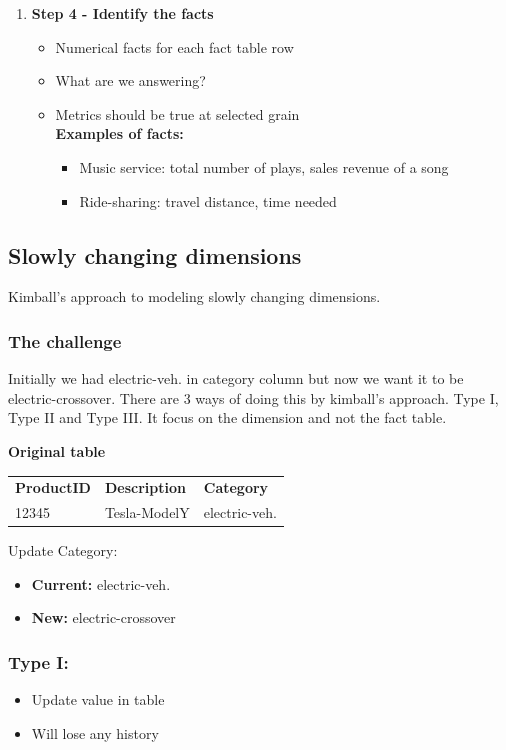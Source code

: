 \begin{enumerate}
\begin{itemize}
\begin{itemize}
        \end{itemize}
    \end{itemize}
    \item \textbf{Step 4 - Identify the facts}
    \begin{itemize}
        \item Numerical facts for each fact table row
        \item What are we answering?
        \item Metrics should be true at selected grain \\
        \textbf{Examples of facts:}
        \begin{itemize}
            \item Music service: total number of plays, sales revenue of a song
            \item Ride-sharing: travel distance, time needed
        \end{itemize}
    \end{itemize}
\end{enumerate}

\subsection{Slowly changing dimensions}
Kimball's approach to modeling slowly changing dimensions.
\subsubsection{The challenge}
Initially we had electric-veh. in category column but now we want it to be electric-crossover. There are 3 ways of doing 
this by kimball's approach. Type I, Type II and Type III. It focus on the dimension and not the fact table.

\textbf{Original table} \\
\begin{tabular}{lll}
    \textbf{ProductID} & \textbf{Description} & \textbf{Category} \\
    12345 & Tesla-ModelY & electric-veh.
\end{tabular}

Update Category:
\begin{itemize}
    \item \textbf{Current:} electric-veh.
    \item \textbf{New:} electric-crossover
\end{itemize}

\subsubsection{Type I:}
\begin{itemize}
    \item Update value in table
    \item Will lose any history
\end{itemize}

